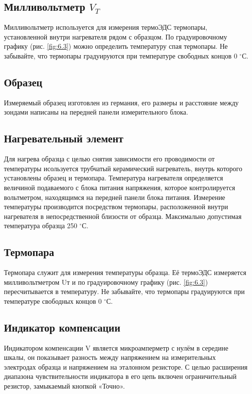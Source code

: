 		\subsection{Милливольтметр $V_T$}
		Милливольтметр используется для измерения термоЭДС термопары, установленной внутри нагревателя рядом с образцом. По
		градуировочному графику (рис. \ref{fig:6.3}) можно определить температуру спая термопары. Не забывайте, что термопары градуируются
		при температуре свободных концов 0 $^{\circ} $С.
		
		\subsection{Образец}
		Измеряемый образец изготовлен из германия, его размеры и расстояние между зондами написаны на передней панели измерительного блока.
		
		\subsection{Нагревательный элемент}
		Для нагрева образца с целью снятия зависимости его проводимости от температуры исользуется трубчатый керамический
		нагреватель, внутрь которого установлены образец и термопара. Температура нагревателя определяется величиной подаваемого
		с блока питания напряжения, которое контролируется вольтметром, находящимся на передней панели блока питания. Измерение
		температуры производится посредством термопары, расположенной внутри нагревателя в непосредственной близости от образца.
		Максимально допустимая температура образца 250 $^{\circ}$С.
		
		\subsection{Термопара}
		Термопара служит для измерения температуры образца. Её термоЭДС измеряется милливольтметром Uт и по градуировочному
		графику (рис. \ref{fig:6.3}) пересчитывается в температуру. Не забывайте, что термопары градуируются при температуре свободных
		концов 0 $^{\circ}$С.
		
		\subsection{Индикатор компенсации}
		Индикатором компенсации V является микроамперметр с нулём в середине шкалы, он показывает разность между напряжением на
		измерительных электродах образца и напряжением на эталонном резисторе. С целью расширения диапазона чувствительности
		индикатора в его цепь включен ограничительный резистор, замыкаемый кнопкой «Точно».
		
